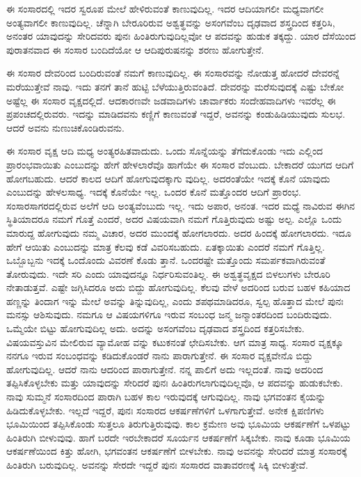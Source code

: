 {\small ಈ ಸಂಸಾರದಲ್ಲಿ ಇದರ ಸ್ವರೂಪ ಮೇಲೆ ಹೇಳಿರುವಂತೆ ಕಾಣುವುದಿಲ್ಲ. ಇದರ ಆದಿಯಾಗಲೀ ಮಧ್ಯವಾಗಲೀ ಅಂತ್ಯವಾಗಲೀ ಕಾಣುವುದಿಲ್ಲ. ಚೆನ್ನಾಗಿ ಬೇರೂರಿರುವ ಅಶ್ವತ್ಥವನ್ನು ಅಸಂಗವೆಂಬ ದೃಢವಾದ ಶಸ್ತ್ರದಿಂದ ಕತ್ತರಿಸಿ, ಅನಂತರ ಯಾವುದನ್ನು ಸೇರಿದವರು ಪುನಃ ಹಿಂತಿರುಗುವುದಿಲ್ಲವೋ ಆ ಪದವನ್ನು ಹುಡುಕ ತಕ್ಕದ್ದು. ಯಾರ ದೆಸೆಯಿಂದ ಪುರಾತನವಾದ ಈ ಸಂಸಾರ ಬಂದಿದೆಯೋ ಆ ಆದಿಪುರುಷನನ್ನು ಶರಣು ಹೋಗುತ್ತೇನೆ.}

ಈ ಸಂಸಾರ ದೇವರಿಂದ ಬಂದಿರುವಂತೆ ನಮಗೆ ಕಾಣುವುದಿಲ್ಲ. ಈ ಸಂಸಾರವನ್ನು ನೋಡುತ್ತ ಹೋದರೆ ದೇವರನ್ನೆ ಮರೆಯುತ್ತೇವೆ ನಾವು. ಇದು ತನಗೆ ತಾನೆ ಹುಟ್ಟಿ ಬೆಳೆಯುತ್ತಿರುವಂತಿದೆ. ದೇವರನ್ನು ಮರೆಸುವುದಕ್ಕೆ ಎಷ್ಟು ಬೇಕೋ ಅಷ್ಟೆಲ್ಲ ಈ ಸಂಸಾರ ವೃಕ್ಷದಲ್ಲಿದೆ. ಆದಕಾರಣವೇ ಜಡವಾದಿಗಳು ಚಾರ್ವಾಕರು ಸಂದೇಹವಾದಿಗಳು ಇವರೆಲ್ಲ ಈ ಪ್ರಪಂಚದಲ್ಲಿರುವರು. ಇದನ್ನು ಮಾಡಿದವನು ಕಣ್ಣಿಗೆ ಕಾಣುವಂತೆ ಇದ್ದರೆ, ಅವನನ್ನು ಕಂಡುಹಿಡಿಯುವುದು ಸುಲಭ. ಆದರೆ ಅವನು ನುಣುಚಿಕೊಂಡಿರುವನು.

ಈ ಸಂಸಾರ ವೃಕ್ಷ ಆದಿ ಮಧ್ಯ ಅಂತ್ಯರಹಿತವಾದುದು. ಒಂದು ಸೊನ್ನೆಯನ್ನು ತೆಗೆದುಕೊಂಡು ಇದು ಎಲ್ಲಿಂದ ಪ್ರಾರಂಭವಾಯಿತು ಎಂಬುದನ್ನು ಹೇಗೆ ಹೇಳಲಾರೆವೊ ಹಾಗೆಯೇ ಈ ಸಂಸಾರ ವೆಂಬುದು. ಬೇಕಾದರೆ ಯುಗದ ಆದಿಗೆ ಹೋಗಬಹುದು. ಆದರೆ ಕಾಲದ ಆದಿಗೆ ಹೋಗುವುದಕ್ಕಾಗು ವುದಿಲ್ಲ. ಅದರಂತೆಯೇ ಇದಕ್ಕೆ ಕೊನೆ ಯಾವುದು ಎಂಬುದನ್ನು ಹೇಳಲಸಾಧ್ಯ. ಇದಕ್ಕೆ ಕೊನೆಯೇ ಇಲ್ಲ. ಒಂದರ ಕೊನೆ ಮತ್ತೊಂದರ ಆದಿಗೆ ಪ್ರಾರಂಭ. ಸಂಸಾರಸಾಗರದಲ್ಲಿರುವ ಅಲೆಗೆ ಆದಿ ಅಂತ್ಯವೆಂಬುದು ಇಲ್ಲ. ಇದು ಅಪಾರ, ಅನಂತ. ಇದರ ಮಧ್ಯೆ ನಾವಿರುವ ಈಗಿನ ಸ್ಥಿತಿಯಾದರೂ ನಮಗೆ ಗೊತ್ತೆ ಎಂದರೆ, ಅದರ ವಿಷಯವಾಗಿ ನಮಗೆ ಗೊತ್ತಿರುವುದು ಅಷ್ಟು ಅಲ್ಪ. ಎಲ್ಲೊ ಒಂದು ಮಾರುದ್ದ ಹೋಗುವುದು ನಮ್ಮ ವಿಚಾರ, ಅದರ ಮುಂದಕ್ಕೆ ಹೋಗಲಾರದು. ಅದರ ಹಿಂದಕ್ಕೆ ಹೋಗಲಾರದು. ಇದೂ ಹೇಗೆ ಆಯಿತು ಎಂಬುದನ್ನು ಮಾತ್ರ ಕೆಲವು ಕಡೆ ವಿವರಿಸಬಹುದು. ಏತಕ್ಕಾಯಿತು ಎಂದರೆ ನಮಗೆ ಗೊತ್ತಿಲ್ಲ. ಒಬ್ಬೊಬ್ಬನು ಇದಕ್ಕೆ ಒಂದೊಂದು ವಿವರಣೆ ಕೊಡು ತ್ತಾನೆ. ಒಂದರಷ್ಟೇ ಮತ್ತೊಂದು ಸಮರ್ಪಕವಾಗಿರುವಂತೆ ತೋರುವುದು. ಇದೇ ಸರಿ ಎಂದು ಯಾವುದನ್ನೂ ನಿರ್ಧರಿಸುವಂತಿಲ್ಲ. ಈ ಅಶ್ವತ್ಥವೃಕ್ಷದ ಬಿಳಲುಗಳು ಬೇರೂರಿ ನೇತಾಡುತ್ತವೆ. ಎಷ್ಟೇ ಜಗ್ಗಿಸಿದರೂ ಅದು ಬಿದ್ದು ಹೋಗುವುದಿಲ್ಲ. ಕೆಲವು ವೇಳೆ ಅದರಿಂದ ಬರುವ ಬಹಳ ಕಹಿಯಾದ ಹಣ್ಣನ್ನು ತಿಂದಾಗ ಇನ್ನು ಮೇಲೆ ಅವನ್ನು ತಿನ್ನುವುದಿಲ್ಲ, ಎಂದು ಶಪಥಮಾಡಿದರೂ, ಸ್ವಲ್ಪ ಹೊತ್ತಾದ ಮೇಲೆ ಪುನಃ ಮನಸ್ಸು ಆಶಿಸುವುದು. ನಮಗೂ ಆ ವಿಷಯಗಳಿಗೂ ಇರುವ ಸಂಬಂಧ ಜನ್ಮ ಜನ್ಮಾಂತರದಿಂದ ಬಂದಿರುವುದು. ಒಮ್ಮೆಯೇ ಬಿಟ್ಟು ಹೋಗುವುದಿಲ್ಲ ಅದು. ಅದನ್ನು ಅಸಂಗವೆಂಬ ದೃಢವಾದ ಶಸ್ತ್ರದಿಂದ ಕತ್ತರಿಸಬೇಕು. ವಿಷಯವಸ್ತುವಿನ ಮೇಲಿರುವ ವ್ಯಾಮೋಹ ವನ್ನು ಕಟುಕನಂತೆ ಛೇದಿಸಬೇಕು. ಆಗ ಮಾತ್ರ ಸಾಧ್ಯ. ಸಂಸಾರ ವೃಕ್ಷಕ್ಕೂ ನನಗೂ ಇರುವ ಸಂಬಂಧವನ್ನು ಕಡಿದುಕೊಂಡರೆ ನಾನು ಪಾರಾಗುತ್ತೇನೆ. ಈ ಸಂಸಾರ ವೃಕ್ಷವೇನೊ ಬಿದ್ದು ಹೋಗುವುದಿಲ್ಲ. ಆದರೆ ನಾನು ಆದರಿಂದ ಪಾರಾಗುತ್ತೇನೆ. ನನ್ನ ಪಾಲಿಗೆ ಅದು ಇಲ್ಲದಂತೆ. ನಾವು ಅದರಿಂದ ತಪ್ಪಿಸಿಕೊಳ್ಳಬೇಕು ಮತ್ತು ಯಾವುದನ್ನು ಸೇರಿದರೆ ಪುನಃ ಹಿಂತಿರುಗಲಾಗುವುದಿಲ್ಲವೊ, ಆ ಪದವನ್ನು ಹುಡುಕಬೇಕು. ನಾವು ಸುಮ್ಮನೆ ಸಂಸಾರದಿಂದ ಪಾರಾಗಿ ಬಹಳ ಕಾಲ ಇರುವುದಕ್ಕೆ ಆಗುವುದಿಲ್ಲ. ನಾವು ಭಗವಂತನ ಕೈಯನ್ನು ಹಿಡಿದುಕೊಳ್ಳಬೇಕು. ಇಲ್ಲದೆ ಇದ್ದರೆ, ಪುನಃ ಸಂಸಾರದ ಆಕರ್ಷಣೆಗಳಿಗೆ ಒಳಗಾಗುತ್ತೇವೆ. ಅನೇಕ ಕ್ಷಿಪಣಿಗಳು ಭೂಮಿಯಿಂದ ತಪ್ಪಿಸಿಕೊಂಡು ಸುತ್ತಲೂ ತಿರುಗುತ್ತಿರುವುವು. ಕಾಲ ಕ್ರಮೇಣ ಅವು ಭೂಮಿಯ ಆಕರ್ಷಣೆಗೆ ಒಳಪಟ್ಟು ಹಿಂತಿರುಗಿ ಬೀಳುವುವು. ಹಾಗೆ ಬರದೇ ಇರಬೇಕಾದರೆ ಸೂರ್ಯನ ಆಕರ್ಷಣೆಗೆ ಸಿಕ್ಕಬೇಕು. ನಾವು ಕೂಡಾ ಭೂಮಿಯ ಆಕರ್ಷಣೆಯಿಂದ ಕಿತ್ತು ಹೋಗಿ, ಭಗವಂತನ ಆಕರ್ಷಣೆಗೆ ಬೀಳಬೇಕು. ನಾವು ಅವನನ್ನು ಸೇರಿದರೆ ಮಾತ್ರ ಸಂಸಾರಕ್ಕೆ ಹಿಂತಿರುಗಿ ಬರುವುದಿಲ್ಲ. ಅವನನ್ನು ಸೇರದೇ ಇದ್ದರೆ ಪುನಃ ಸಂಸಾರದ ವಾತಾವರಣಕ್ಕೆ ಸಿಕ್ಕಿ ಬೀಳುತ್ತೇವೆ.

